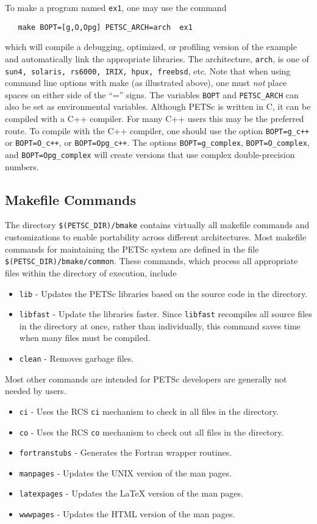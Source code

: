 To make a program named {\tt ex1}, one may use the command
\begin{verbatim}
   make BOPT=[g,O,Opg] PETSC_ARCH=arch  ex1
\end{verbatim}
which will compile a debugging, optimized, or profiling version
of the example and automatically link the appropriate libraries.  The
architecture, {\tt arch}, is one of {\tt sun4, solaris, rs6000, IRIX,
hpux, freebsd}, etc. Note
that when using command line options with make (as illustrated above),
one must {\em not} place spaces on either side of the ``='' signs.
The variables {\tt BOPT} and 
{\tt PETSC\_ARCH} can also be set as environmental
variables.  Although PETSc is written in C, it can be compiled with a 
C++ compiler.  For many C++ users this may be the preferred route. To compile
with the C++ compiler, one should use the option {\tt BOPT=g\_c++} or 
{\tt BOPT=O\_c++}, or {\tt BOPT=Opg\_c++}.  
The options {\tt BOPT=g\_complex}, {\tt BOPT=O\_complex}, and
{\tt BOPT=Opg\_complex} will
create versions that use complex double-precision numbers. 

\subsection{Makefile Commands} \label{sec:common}

The directory {\tt \$(PETSC\_DIR)/bmake} contains virtually all
makefile commands and customizations to enable portability across
different architectures.  Most makefile commands for maintaining the
PETSc system are defined in the file {\tt \$(PETSC\_DIR)/bmake/common}.  
These commands, which process all appropriate files within the
directory of execution, include
\begin{itemize}
\item {\tt lib} - Updates the PETSc libraries based on the source code
      in the directory.
\item {\tt libfast} - Update the libraries faster.  Since
      {\tt libfast} recompiles all source files in the directory at once,
      rather than individually, this command saves time when many files
      must be compiled.
\item {\tt clean} - Removes garbage files.
\end{itemize}
\noindent Most other commands are intended for PETSc developers are generally
not needed by users.
\begin{itemize}
\item {\tt ci} - Uses the RCS {\tt ci} mechanism to check in all files in the
      directory. 
\item {\tt co} - Uses the RCS {\tt co} mechanism to check out 
      all files in the directory. 
\item {\tt fortranstubs} - Generates the Fortran wrapper routines.  
\item {\tt manpages} - Updates the UNIX version of the man pages.
\item {\tt latexpages} - Updates the LaTeX version of the man pages.
\item {\tt wwwpages} - Updates the HTML version of the man pages.
\end{itemize}

